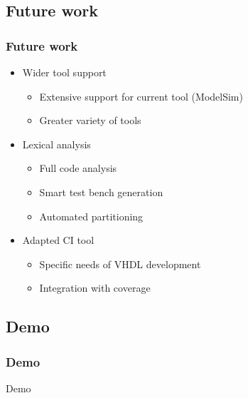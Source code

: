 \documentclass[british,10pt]{beamer}
\begin{document}
\subsection{Future work}

\begin{frame}\frametitle{Future work}
\begin{itemize}
\item Wider tool support
\begin{itemize}
\item Extensive support for current tool (ModelSim)
\item Greater variety of tools 
\end{itemize}
\item Lexical analysis
\begin{itemize}
\item Full code analysis
\item Smart test bench generation
\item Automated partitioning
\end{itemize}
\item Adapted CI tool
\begin{itemize}
\item Specific needs of VHDL development
\item Integration with coverage
\end{itemize}
\end{itemize}
\end{frame}

\subsection{Demo}

\begin{frame}\frametitle{Demo}
\centering
\Huge Demo
\end{frame}
\end{document}
